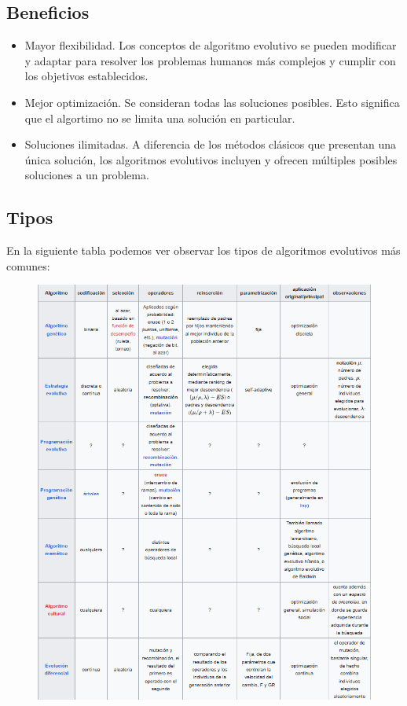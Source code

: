 \documentclass[12pt]{article}
\begin{document}
\subsection{Beneficios}

\begin{itemize}
    \item Mayor flexibilidad. Los conceptos de algoritmo evolutivo se pueden modificar y adaptar para resolver los problemas humanos más complejos y cumplir con los objetivos establecidos.
    \item Mejor optimización. Se consideran todas las soluciones posibles. Esto significa que el algortimo no se limita una solución en particular.
    \item Soluciones ilimitadas. A diferencia de los métodos clásicos que presentan una única solución, los algoritmos evolutivos incluyen y ofrecen múltiples posibles soluciones a un problema.
\end{itemize}

\subsection{Tipos}

En la siguiente tabla podemos ver observar los tipos de algoritmos evolutivos más comunes:

\begin{figure}[h!]
    \centering
    \includegraphics[width=.8\textwidth]{tablaevolutiva.PNG}
    \label{fig:my_label}
\end{figure}
\end{document}
